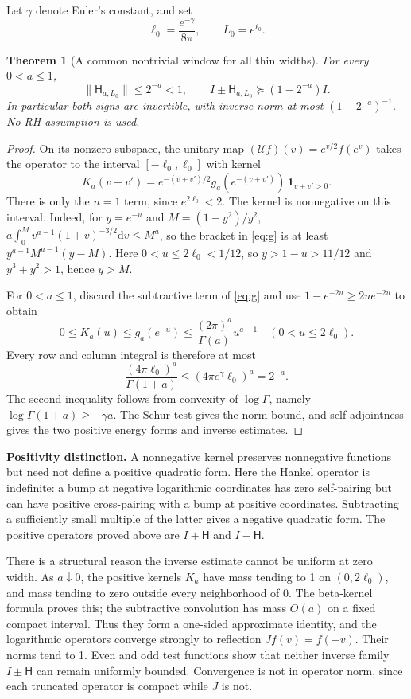 \documentclass[11pt,letterpaper]{article}
\newtheorem{theorem}{Theorem}
\newcommand{\dd}{\mathrm d}
\begin{document}
Let $\gamma$ denote Euler's constant, and set
\begin{equation}\label{eq:window}
 \ell_0=\frac{e^{-\gamma}}{8\pi},\qquad L_0=e^{\ell_0}.
\end{equation}
\begin{theorem}[A common nontrivial window for all thin widths]\label{thm:local}
For every $0<a\leq1$,
\[
 \|\mathsf H_{a,L_0}\|\leq2^{-a}<1,\qquad
 I\pm\mathsf H_{a,L_0}\succeq(1-2^{-a})I.
\]
In particular both signs are invertible, with inverse norm at most $(1-2^{-a})^{-1}$. No RH assumption is used.
\end{theorem}
\begin{proof}
On its nonzero subspace, the unitary map $(\mathcal Uf)(v)=e^{v/2}f(e^v)$ takes the operator to the interval $[-\ell_0,\ell_0]$ with kernel
\[
 K_a(v+v')=e^{-(v+v')/2}g_a(e^{-(v+v')})\,\mathbf1_{v+v'>0}.
\]
There is only the $n=1$ term, since $e^{2\ell_0}<2$.
The kernel is nonnegative on this interval. Indeed, for $y=e^{-u}$ and $M=(1-y^2)/y^2$,
$a\int_0^Mv^{a-1}(1+v)^{-3/2}\dd v\leq M^a$, so the bracket in \eqref{eq:g} is at least $y^{a-1}M^{a-1}(y-M)$. Here $0<u\leq2\ell_0<1/12$, so $y>1-u>11/12$ and $y^3+y^2>1$, hence $y>M$.

For $0<a\leq1$, discard the subtractive term of \eqref{eq:g} and use $1-e^{-2u}\geq2ue^{-2u}$ to obtain
\[
 0\leq K_a(u)\leq g_a(e^{-u})
 \leq\frac{(2\pi)^a}{\Gamma(a)}u^{a-1}\quad(0<u\leq2\ell_0).
\]
Every row and column integral is therefore at most
\[
 \frac{(4\pi\ell_0)^a}{\Gamma(1+a)}
 \leq(4\pi e^\gamma\ell_0)^a=2^{-a}.
\]
The second inequality follows from convexity of $\log\Gamma$, namely $\log\Gamma(1+a)\geq-\gamma a$. The Schur test gives the norm bound, and self-adjointness gives the two positive energy forms and inverse estimates.
\end{proof}

\textbf{Positivity distinction.} A nonnegative kernel preserves nonnegative functions but need not define a positive quadratic form. Here the Hankel operator is indefinite: a bump at negative logarithmic coordinates has zero self-pairing but can have positive cross-pairing with a bump at positive coordinates. Subtracting a sufficiently small multiple of the latter gives a negative quadratic form. The positive operators proved above are $I+\mathsf H$ and $I-\mathsf H$.

There is a structural reason the inverse estimate cannot be uniform at zero width. As $a\downarrow0$, the positive kernels $K_a$ have mass tending to 1 on $(0,2\ell_0)$, and mass tending to zero outside every neighborhood of 0. The beta-kernel formula proves this; the subtractive convolution has mass $O(a)$ on a fixed compact interval. Thus they form a one-sided approximate identity, and the logarithmic operators converge strongly to reflection $Jf(v)=f(-v)$. Their norms tend to 1. Even and odd test functions show that neither inverse family $I\pm\mathsf H$ can remain uniformly bounded. Convergence is not in operator norm, since each truncated operator is compact while $J$ is not.
\end{document}
